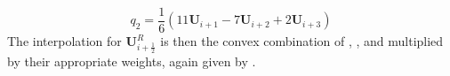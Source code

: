 \begin{equation}\label{eqn:q25}
	q_2 = \frac{1}{6} \left( 11 \boldsymbol{U}_{i+1} - 7 \boldsymbol{U}_{i+2} + 2 \boldsymbol{U}_{i+3} \right)
\end{equation}
The interpolation for $\boldsymbol{U}_{i+\frac{1}{2}}^R$ is then the convex combination of , , and  multiplied by their appropriate weights, again given by .
